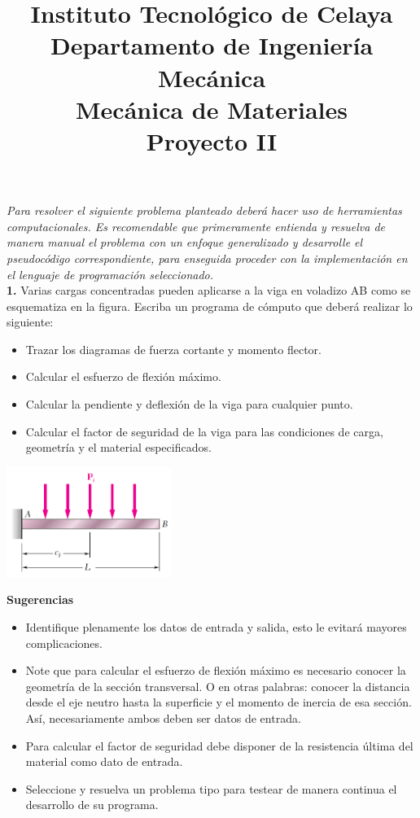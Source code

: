 \documentclass[12pt,letterpaper]{article}
\title{
\vspace{-20mm}
{\normalsize Instituto Tecnológico de Celaya} \\[-2mm]
{\normalsize Departamento de Ingeniería Mecánica} \\[-2mm]
{\normalsize Mecánica de Materiales} \\[-2mm]
{\normalsize\bfseries Proyecto II} \\[-2mm]
}
\date{}
\begin{document}
\maketitle
\vspace{-10mm}

\textit{Para resolver el siguiente problema planteado deberá hacer uso de herramientas computacionales. 
Es recomendable que primeramente entienda y resuelva de manera manual el problema 
con un enfoque generalizado y desarrolle el pseudocódigo correspondiente, para enseguida proceder 
con la implementación en el lenguaje de programación seleccionado.} \\ [5mm]

\textbf{1.} Varias cargas concentradas pueden aplicarse a la viga en voladizo AB como se esquematiza 
en la figura. Escriba un programa de cómputo que deberá realizar lo siguiente:

\begin{itemize}[itemsep=0,label={o}]
\item Trazar los diagramas de fuerza cortante y momento flector.
\item Calcular el esfuerzo de flexión máximo.
\item Calcular la pendiente y deflexión de la viga para cualquier punto.
\item Calcular el factor de seguridad de la viga para las condiciones de carga, geometría 
y el material especificados.
\end{itemize}

\begin{center}
\includegraphics[width=0.4\textwidth]{img/p1.png}
\end{center}

\textbf{Sugerencias}
\begin{itemize}[itemsep=0,label={o}]
\item Identifique plenamente los datos de entrada y salida, esto le evitará mayores complicaciones.
\item Note que para calcular el esfuerzo de flexión máximo es necesario conocer la geometría de la sección 
transversal. O en otras palabras: conocer la distancia desde el eje neutro hasta la superficie y 
el momento de inercia de esa sección. Así, necesariamente ambos deben ser datos de entrada.
\item Para calcular el factor de seguridad debe disponer de la resistencia última del material como dato de entrada.
\item Seleccione y resuelva un problema tipo para testear de manera continua el desarrollo de su programa.
\end{itemize}
\end{document}
